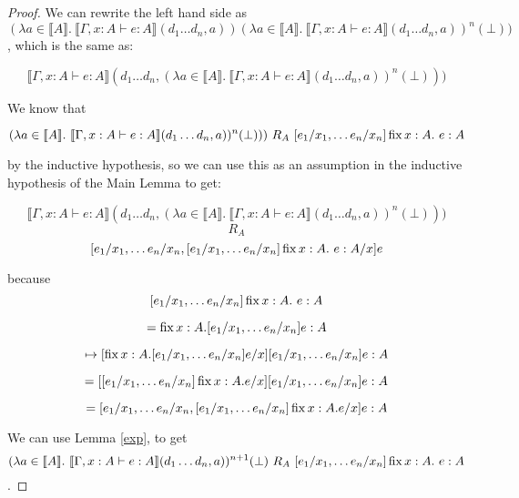 \begin{proof}
We can rewrite the left hand side as $(\lambda a \in \llbracket A \rrbracket. \ \llbracket \Gamma, x : A \vdash e : A \rrbracket(d_1 \dots d_n,a))(\lambda a \in \llbracket A \rrbracket. \ \llbracket \Gamma, x : A \vdash e : A \rrbracket(d_1 \dots d_n,a))^n(\bot)) $, which is the same as:

\[ \llbracket \Gamma, x : A \vdash e : A \rrbracket(d_1 \dots d_n,(\lambda a \in \llbracket A \rrbracket. \ \llbracket \Gamma, x : A \vdash e : A \rrbracket(d_1 \dots d_n,a))^n(\bot)))\]

We know that 

\[(\lambda a \in \llbracket A \rrbracket. \ \llbracket \Gamma, x : A \vdash e : A \rrbracket(d_1 \dots d_n,a))^n(\bot))) \ R_A \ [e_1/x_1, \dots e_n/x_n]\operatorname{fix} x : A. \ e : A\]

by the inductive hypothesis, so we can use this as an assumption in the inductive hypothesis of the Main Lemma to get:

\[ \llbracket \Gamma, x : A \vdash e : A \rrbracket(d_1 \dots d_n,(\lambda a \in \llbracket A \rrbracket. \ \llbracket \Gamma, x : A \vdash e : A \rrbracket(d_1 \dots d_n,a))^n(\bot)))\]
\[ R_A \]
\[ [e_1/x_1, \dots e_n/x_n, [e_1/x_1, \dots e_n/x_n]\operatorname{fix} x : A. \ e : A/x]e \]

because 
\[[e_1/x_1, \dots e_n/x_n]\operatorname{fix} x : A. \ e : A \]

\[ = \operatorname{fix}  x : A. [e_1/x_1, \dots e_n/x_n]e : A \]

\[\mapsto [\operatorname{fix} x:A. [e_1/x_1, \dots e_n/x_n]e/x][e_1/x_1, \dots e_n/x_n] e : A\]

\[ = [[e_1/x_1, \dots e_n/x_n] \operatorname{fix} x:A. e/x] [e_1/x_1, \dots e_n/x_n] e : A\]

\[ = [e_1/x_1, \dots e_n/x_n, [e_1/x_1, \dots e_n/x_n] \operatorname{fix} x:A. e/x] e : A \]

We can use Lemma \ref{exp}, to get 
\[(\lambda a \in \llbracket A \rrbracket. \ \llbracket \Gamma, x : A \vdash e : A \rrbracket(d_1 \dots d_n,a))^{n+1}(\bot) \ R_A \ [e_1/x_1, \dots e_n/x_n]\fix x : A. \ e : A\].





 



\end{proof}

